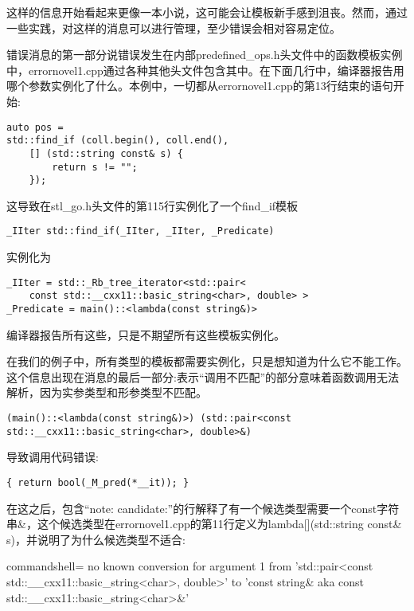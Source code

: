 这样的信息开始看起来更像一本小说，这可能会让模板新手感到沮丧。然而，通过一些实践，对这样的消息可以进行管理，至少错误会相对容易定位。

错误消息的第一部分说错误发生在内部predefined\_ops.h头文件中的函数模板实例中，errornovel1.cpp通过各种其他头文件包含其中。在下面几行中，编译器报告用哪个参数实例化了什么。本例中，一切都从errornovel1.cpp的第13行结束的语句开始:

\begin{lstlisting}[style=styleCXX]
auto pos = 
std::find_if (coll.begin(), coll.end(),
	[] (std::string const& s) {
		return s != "";
	});
\end{lstlisting}

这导致在stl\_go.h头文件的第115行实例化了一个find\_if模板

\begin{lstlisting}[style=styleCXX]
_IIter std::find_if(_IIter, _IIter, _Predicate)
\end{lstlisting}

实例化为

\begin{lstlisting}[style=styleCXX]
_IIter = std::_Rb_tree_iterator<std::pair<
	const std::__cxx11::basic_string<char>, double> >
_Predicate = main()::<lambda(const string&)>
\end{lstlisting}

编译器报告所有这些，只是不期望所有这些模板实例化。

在我们的例子中，所有类型的模板都需要实例化，只是想知道为什么它不能工作。这个信息出现在消息的最后一部分:表示“调用不匹配”的部分意味着函数调用无法解析，因为实参类型和形参类型不匹配。

\begin{lstlisting}[style=styleCXX]
(main()::<lambda(const string&)>) (std::pair<const std::__cxx11::basic_string<char>, double>&)
\end{lstlisting}

导致调用代码错误:

\begin{lstlisting}[style=styleCXX]
{ return bool(_M_pred(*__it)); }
\end{lstlisting}

在这之后，包含“note: candidate:”的行解释了有一个候选类型需要一个const字符串\&，这个候选类型在errornovel1.cpp的第11行定义为lambda[](std::string const\& s)，并说明了为什么候选类型不适合:

{\scriptsize
\begin{tcblisting}{commandshell={}}
no known conversion for argument 1
from ’std::pair<const std::__cxx11::basic_string<char>, double>’
to ’const string& {aka const std::__cxx11::basic_string<char>&}’
\end{tcblisting}
}

